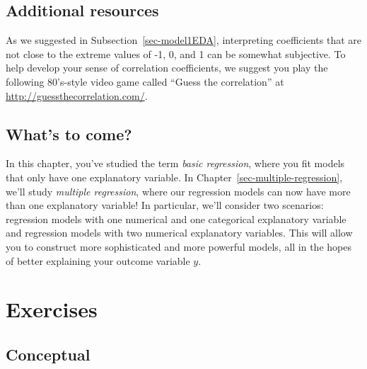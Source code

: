 \documentclass[
  letterpaper,
  DIV=11,
  numbers=noendperiod]{scrreprt}
\theoremstyle{definition}
\theoremstyle{remark}
\begin{document}
\hypertarget{sec-additional-resources-basic-regression}{%
\subsection{Additional
resources}\label{sec-additional-resources-basic-regression}}

As we suggested in Subsection~\ref{sec-model1EDA}, interpreting
coefficients that are not close to the extreme values of -1, 0, and 1
can be somewhat subjective. To help develop your sense of correlation
coefficients, we suggest you play the following 80's-style video game
called ``Guess the correlation'' at
\url{http://guessthecorrelation.com/}.

\hypertarget{whats-to-come-2}{%
\subsection{What's to come?}\label{whats-to-come-2}}

In this chapter, you've studied the term \emph{basic regression}, where
you fit models that only have one explanatory variable. In
Chapter~\ref{sec-multiple-regression}, we'll study \emph{multiple
regression}, where our regression models can now have more than one
explanatory variable! In particular, we'll consider two scenarios:
regression models with one numerical and one categorical explanatory
variable and regression models with two numerical explanatory variables.
This will allow you to construct more sophisticated and more powerful
models, all in the hopes of better explaining your outcome variable
\(y\).

\hypertarget{sec-ex05}{%
\section{Exercises}\label{sec-ex05}}

\hypertarget{sec-ex05-conceptual}{%
\subsection{Conceptual}\label{sec-ex05-conceptual}}
\end{document}
